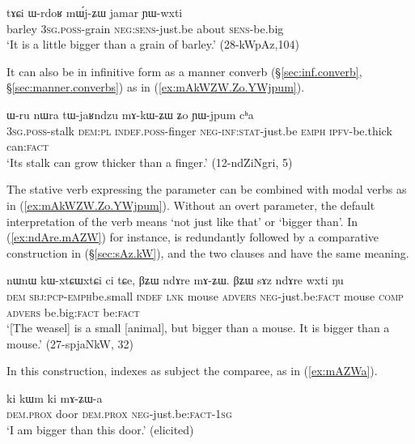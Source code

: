 \begin{exe}
\ex \label{ex:mWjZW.jamar}
 \gll tɤɕi ɯ-rdoʁ mɯ́j-ʑɯ jamar ɲɯ-wxti \\
 barley \textsc{3sg}.\textsc{poss}-grain \textsc{neg}:\textsc{sens}-just.be about \textsc{sens}-be.big \\
 \glt `It is a little bigger than a grain of barley.' (28-kWpAz,104)
\end{exe}

It can also be in infinitive form  as a manner converb (§\ref{sec:inf.converb}, §\ref{sec:manner.converbs}) as in (\ref{ex:mAkWZW.Zo.YWjpum}). 

\begin{exe}
\ex \label{ex:mAkWZW.Zo.YWjpum}
 \gll ɯ-ru nɯra tɯ-jaʁndzu mɤ-kɯ-ʑɯ ʑo ɲɯ-jpum cʰa \\
\textsc{3sg}.\textsc{poss}-stalk \textsc{dem}:\textsc{pl} \textsc{indef}.\textsc{poss}-finger \textsc{neg}-\textsc{inf}:\textsc{stat}-just.be \textsc{emph} \textsc{ipfv}-be.thick can:\textsc{fact} \\
 \glt `Its stalk can grow thicker than a finger.' (12-ndZiNgri, 5)
\end{exe}

The stative verb expressing the parameter can be combined with modal verbs as in (\ref{ex:mAkWZW.Zo.YWjpum}). Without an overt parameter, the default interpretation of the verb  means `not just like that' or `bigger than'. In (\ref{ex:ndAre.mAZW}) for instance,  is redundantly followed by a comparative construction in  (§\ref{sec:sAz.kW}), and the two clauses  and  have the same meaning.

\begin{exe}
\ex \label{ex:ndAre.mAZW}
 \gll nɯnɯ kɯ-xtɕɯ\redp{}xtɕi ci tɕe, βʑɯ ndɤre mɤ-ʑɯ. βʑɯ sɤz ndɤre wxti ŋu \\
 \textsc{dem} \textsc{sbj}:\textsc{pcp}-\textsc{emph}\redp{}be.small \textsc{indef} \textsc{lnk} mouse \textsc{advers} \textsc{neg}-just.be:\textsc{fact} mouse \textsc{comp} \textsc{advers} be.big:\textsc{fact} be:\textsc{fact} \\
\glt `[The weasel] is a small [animal], but bigger than a mouse. It is bigger than a mouse.' (27-spjaNkW, 32)
\end{exe}

In this construction,  indexes as subject the comparee, as in (\ref{ex:mAZWa}).

\begin{exe}
\ex \label{ex:mAZWa}
 \gll ki kɯm ki mɤ-ʑɯ-a \\
\textsc{dem}.\textsc{prox} door \textsc{dem}.\textsc{prox} \textsc{neg}-just.be:\textsc{fact}-\textsc{1sg} \\
\glt `I am bigger than this door.' (elicited)
\end{exe}


